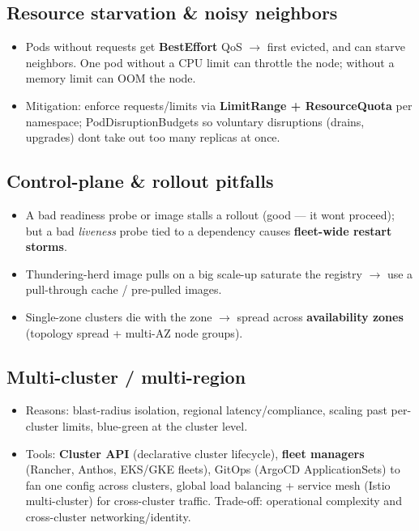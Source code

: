 \documentclass[11pt]{article}
\providecommand{\tightlist}{\setlength{\itemsep}{1pt}\setlength{\parskip}{0pt}}
\begin{document}
\subsection{Resource starvation \& noisy neighbors}\label{resource-starvation--noisy-neighbors}

\begin{itemize}
\tightlist
\item
  Pods without requests get \textbf{BestEffort} QoS \(\rightarrow\) first evicted, and can starve neighbors. One pod without a CPU limit can throttle the node; without a memory limit can OOM the node.
\item
  Mitigation: enforce requests/limits via \textbf{LimitRange + ResourceQuota} per namespace; PodDisruptionBudgets so voluntary disruptions (drains, upgrades) don\textquotesingle t take out too many replicas at once.
\end{itemize}

\subsection{Control-plane \& rollout pitfalls}\label{control-plane--rollout-pitfalls}

\begin{itemize}
\tightlist
\item
  A bad readiness probe or image stalls a rollout (good --- it won\textquotesingle t proceed); but a bad \emph{liveness} probe tied to a dependency causes \textbf{fleet-wide restart storms}.
\item
  Thundering-herd image pulls on a big scale-up saturate the registry \(\rightarrow\) use a pull-through cache / pre-pulled images.
\item
  Single-zone clusters die with the zone \(\rightarrow\) spread across \textbf{availability zones} (topology spread + multi-AZ node groups).
\end{itemize}

\subsection{Multi-cluster / multi-region}\label{multi-cluster--multi-region}

\begin{itemize}
\tightlist
\item
  Reasons: blast-radius isolation, regional latency/compliance, scaling past per-cluster limits, blue-green at the cluster level.
\item
  Tools: \textbf{Cluster API} (declarative cluster lifecycle), \textbf{fleet managers} (Rancher, Anthos, EKS/GKE fleets), GitOps (ArgoCD ApplicationSets) to fan one config across clusters, global load balancing + service mesh (Istio multi-cluster) for cross-cluster traffic. Trade-off: operational complexity and cross-cluster networking/identity.
\end{itemize}
\end{document}
